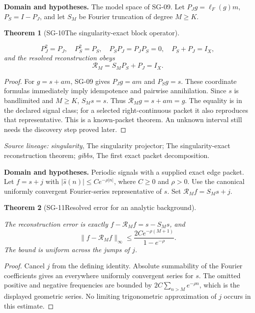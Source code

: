 \documentclass[11pt]{article}
\newtheorem{theorem}{Theorem}[section]
\theoremstyle{definition}\newtheorem{definition}[theorem]{Definition}
\theoremstyle{remark}\newtheorem{remark}[theorem]{Remark}
\begin{document}
\par{\small\textbf{Domain and hypotheses.} The model space of SG-09. Let $P_Jg=\ell_F(g)m$, $P_S=I-P_J$, and let $S_M$ be Fourier truncation of degree $M\ge K$.}\par
\begin{theorem}[SG-10\quad The singularity-exact block operator]\label{SG-10}

\[
 P_J^2=P_J,\quad P_S^2=P_S,\quad P_SP_J=P_JP_S=0,
 \quad P_S+P_J=I_X,
\]
and the resolved reconstruction obeys
\[
 \mathcal R_M=S_MP_S+P_J=I_X.
\]

\end{theorem}
\begin{proof}

For $g=s+am$, SG-09 gives $P_Jg=am$ and $P_Sg=s$.
These coordinate formulas immediately imply idempotence and pairwise
annihilation. Since $s$ is bandlimited and $M\ge K$, $S_Ms=s$.
Thus $\mathcal R_Mg=s+am=g$. The equality is in the declared signal class;
for a selected right-continuous packet it also reproduces that representative.
This is a known-packet theorem. An unknown interval still needs the discovery
step proved later.

\end{proof}

\par{\small\color{Teal}\textit{Source lineage:} \textit{singularity}, The singularity projector; The singularity-exact reconstruction theorem; \textit{gibbs}, The first exact packet decomposition.}\par

\par{\small\textbf{Domain and hypotheses.} Periodic signals with a supplied exact edge packet. Let $f=s+j$ with $|\widehat s(n)|\le Ce^{-\rho|n|}$, where $C\ge0$ and $\rho>0$. Use the canonical uniformly convergent Fourier-series representative of $s$. Set $\mathcal R_Mf=S_Ms+j$.}\par
\begin{theorem}[SG-11\quad Resolved error for an analytic background]\label{SG-11}

The reconstruction error is exactly $f-\mathcal R_Mf=s-S_Ms$, and
\[
 \|f-\mathcal R_Mf\|_\infty
 \le\frac{2Ce^{-\rho(M+1)}}{1-e^{-\rho}}.
\]
The bound is uniform across the jumps of $j$.

\end{theorem}
\begin{proof}

Cancel $j$ from the defining identity. Absolute summability of the Fourier
coefficients gives an everywhere uniformly convergent series for $s$.
The omitted positive and negative frequencies are bounded by
$2C\sum_{n>M}e^{-\rho n}$, which is the displayed geometric series.
No limiting trigonometric approximation of $j$ occurs in this estimate.

\end{proof}
\end{document}
